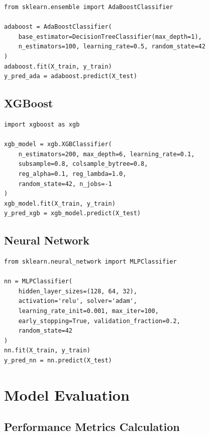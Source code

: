 \begin{verbatim}
from sklearn.ensemble import AdaBoostClassifier

adaboost = AdaBoostClassifier(
    base_estimator=DecisionTreeClassifier(max_depth=1),
    n_estimators=100, learning_rate=0.5, random_state=42
)
adaboost.fit(X_train, y_train)
y_pred_ada = adaboost.predict(X_test)
\end{verbatim}

\subsection{XGBoost}

\begin{verbatim}
import xgboost as xgb

xgb_model = xgb.XGBClassifier(
    n_estimators=200, max_depth=6, learning_rate=0.1,
    subsample=0.8, colsample_bytree=0.8,
    reg_alpha=0.1, reg_lambda=1.0,
    random_state=42, n_jobs=-1
)
xgb_model.fit(X_train, y_train)
y_pred_xgb = xgb_model.predict(X_test)
\end{verbatim}

\subsection{Neural Network}

\begin{verbatim}
from sklearn.neural_network import MLPClassifier

nn = MLPClassifier(
    hidden_layer_sizes=(128, 64, 32),
    activation='relu', solver='adam',
    learning_rate_init=0.001, max_iter=100,
    early_stopping=True, validation_fraction=0.2,
    random_state=42
)
nn.fit(X_train, y_train)
y_pred_nn = nn.predict(X_test)
\end{verbatim}

\section{Model Evaluation}

\subsection{Performance Metrics Calculation}

